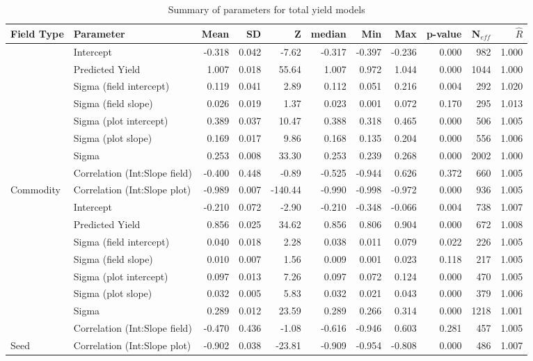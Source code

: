 \documentclass[12pt]{article} %
\begin{document}
\begin{table}[h]
\centering\begingroup\fontsize{9}{11}\selectfont
\caption{Summary of parameters for total yield models}

\begin{tabular}{l|l|r|r|r|r|r|r|r|r|r}
\hline
Field Type & Parameter & Mean & SD & Z & median & Min & Max & p-value & N$_{eff}$ & $\hat{R}$\\
\hline
 & Intercept & -0.318 & 0.042 & -7.62 & -0.317 & -0.397 & -0.236 & 0.000 & 982 & 1.000\\
\cline{2-11}
 & Predicted Yield & 1.007 & 0.018 & 55.64 & 1.007 & 0.972 & 1.044 & 0.000 & 1044 & 1.000\\
\cline{2-11}
 & Sigma (field intercept) & 0.119 & 0.041 & 2.89 & 0.112 & 0.051 & 0.216 & 0.004 & 292 & 1.020\\
\cline{2-11}
 & Sigma (field slope) & 0.026 & 0.019 & 1.37 & 0.023 & 0.001 & 0.072 & 0.170 & 295 & 1.013\\
\cline{2-11}
 & Sigma (plot intercept) & 0.389 & 0.037 & 10.47 & 0.388 & 0.318 & 0.465 & 0.000 & 506 & 1.005\\
\cline{2-11}
 & Sigma (plot slope) & 0.169 & 0.017 & 9.86 & 0.168 & 0.135 & 0.204 & 0.000 & 556 & 1.006\\
\cline{2-11}
 & Sigma & 0.253 & 0.008 & 33.30 & 0.253 & 0.239 & 0.268 & 0.000 & 2002 & 1.000\\
\cline{2-11}
 & Correlation (Int:Slope field) & -0.400 & 0.448 & -0.89 & -0.525 & -0.944 & 0.626 & 0.372 & 660 & 1.005\\
\cline{2-11}
\multirow{-9}{*}{\raggedright\arraybackslash Commodity} & Correlation (Int:Slope plot) & -0.989 & 0.007 & -140.44 & -0.990 & -0.998 & -0.972 & 0.000 & 936 & 1.005\\
\cline{1-11}
 & Intercept & -0.210 & 0.072 & -2.90 & -0.210 & -0.348 & -0.066 & 0.004 & 738 & 1.007\\
\cline{2-11}
 & Predicted Yield & 0.856 & 0.025 & 34.62 & 0.856 & 0.806 & 0.904 & 0.000 & 672 & 1.008\\
\cline{2-11}
 & Sigma (field intercept) & 0.040 & 0.018 & 2.28 & 0.038 & 0.011 & 0.079 & 0.022 & 226 & 1.005\\
\cline{2-11}
 & Sigma (field slope) & 0.010 & 0.007 & 1.56 & 0.009 & 0.001 & 0.023 & 0.118 & 217 & 1.005\\
\cline{2-11}
 & Sigma (plot intercept) & 0.097 & 0.013 & 7.26 & 0.097 & 0.072 & 0.124 & 0.000 & 470 & 1.005\\
\cline{2-11}
 & Sigma (plot slope) & 0.032 & 0.005 & 5.83 & 0.032 & 0.021 & 0.043 & 0.000 & 379 & 1.006\\
\cline{2-11}
 & Sigma & 0.289 & 0.012 & 23.59 & 0.289 & 0.266 & 0.314 & 0.000 & 1218 & 1.001\\
\cline{2-11}
 & Correlation (Int:Slope field) & -0.470 & 0.436 & -1.08 & -0.616 & -0.946 & 0.603 & 0.281 & 457 & 1.005\\
\cline{2-11}
\multirow{-9}{*}{\raggedright\arraybackslash Seed} & Correlation (Int:Slope plot) & -0.902 & 0.038 & -23.81 & -0.909 & -0.954 & -0.808 & 0.000 & 486 & 1.007\\
\hline
\end{tabular}
\label{tab:totalYieldCoefs}
\endgroup{}
\end{table}
\end{document}
